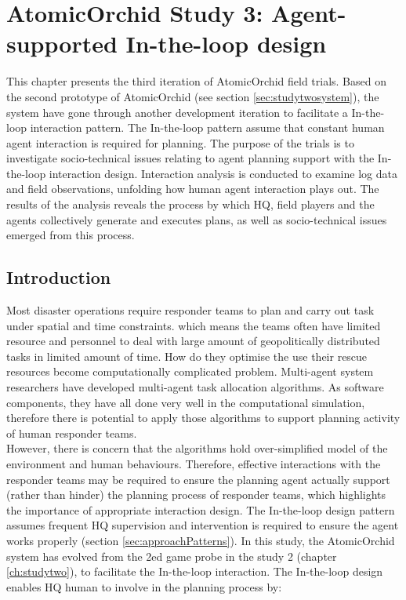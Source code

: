 \chapter{AtomicOrchid Study 3: Agent-supported In-the-loop design}\label{ch:studythree} 
This chapter presents the third iteration of AtomicOrchid field trials. Based on the second prototype of AtomicOrchid (see section \ref{sec:studytwosystem}), the system have gone through another development iteration to facilitate a In-the-loop interaction pattern. The In-the-loop pattern assume that constant human agent interaction is required for planning. The purpose of the trials is to investigate socio-technical issues relating to agent planning support with the In-the-loop interaction design. Interaction analysis is conducted to examine log data and field observations, unfolding how human agent interaction plays out. The results of the analysis reveals the process by which HQ, field players and the agents collectively generate and executes plans, as well as socio-technical issues emerged from this process.  \\


\section{Introduction}
Most disaster operations require responder teams to plan and carry out task under spatial and time constraints. which means the teams often have limited resource and personnel to deal with large amount of geopolitically distributed tasks in limited amount of time. How do they optimise the use their rescue resources become computationally complicated problem. Multi-agent system researchers have developed multi-agent task allocation algorithms. As software components, they have all done very well in the computational simulation, therefore there is potential to apply those algorithms to support planning activity of human responder teams. \\

However, there is concern that the algorithms hold over-simplified model of the environment and human behaviours. Therefore, effective interactions with the responder teams may be required to ensure the planning agent actually support (rather than hinder) the planning process of responder teams, which highlights the importance of appropriate interaction design. The In-the-loop design pattern assumes frequent HQ supervision and intervention is required to ensure the agent works properly (section \ref{sec:approachPatterns}). In this study, the AtomicOrchid system has evolved from the 2ed game probe in the study 2 (chapter \ref{ch:studytwo}), to facilitate the In-the-loop interaction. The In-the-loop design enables HQ human to involve in the planning process by: \\

